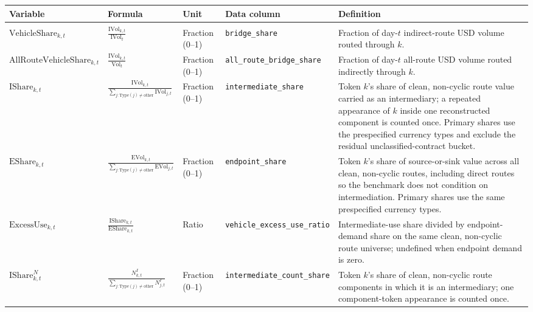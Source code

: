 \begin{tabularx}{\linewidth}{@{}>{\raggedright\arraybackslash}X>{\raggedright\arraybackslash}Xl>{\raggedright\arraybackslash}X>{\raggedright\arraybackslash}X@{}}
\toprule
Variable & Formula & Unit & Data column & Definition \\
\midrule
\addlinespace
\multicolumn{5}{@{}l}{\textit{Vehicle-use measures}} \\
$\mathrm{VehicleShare}_{k,t}$ & $\displaystyle\frac{\mathrm{IVol}_{k,t}}{\mathrm{IVol}_t}$ & Fraction (0--1) & \texttt{bridge\_\allowbreak{}share} & Fraction of day-$t$ indirect-route USD volume routed through $k$. \\
$\mathrm{AllRouteVehicleShare}_{k,t}$ & $\displaystyle\frac{\mathrm{IVol}_{k,t}}{\mathrm{Vol}_t}$ & Fraction (0--1) & \texttt{all\_\allowbreak{}route\_\allowbreak{}bridge\_\allowbreak{}share} & Fraction of day-$t$ all-route USD volume routed indirectly through $k$. \\
$\mathrm{IShare}_{k,t}$ & $\displaystyle\frac{\mathrm{IVol}_{k,t}}{\sum_{j:\mathrm{Type}(j)\ne\mathrm{other}}\mathrm{IVol}_{j,t}}$ & Fraction (0--1) & \texttt{intermediate\_\allowbreak{}share} & Token $k$'s share of clean, non-cyclic route value carried as an intermediary; a repeated appearance of $k$ inside one reconstructed component is counted once. Primary shares use the prespecified currency types and exclude the residual unclassified-contract bucket. \\
$\mathrm{EShare}_{k,t}$ & $\displaystyle\frac{\mathrm{EVol}_{k,t}}{\sum_{j:\mathrm{Type}(j)\ne\mathrm{other}}\mathrm{EVol}_{j,t}}$ & Fraction (0--1) & \texttt{endpoint\_\allowbreak{}share} & Token $k$'s share of source-or-sink value across all clean, non-cyclic routes, including direct routes so the benchmark does not condition on intermediation. Primary shares use the same prespecified currency types. \\
$\mathrm{ExcessUse}_{k,t}$ & $\displaystyle\frac{\mathrm{IShare}_{k,t}}{\mathrm{EShare}_{k,t}}$ & Ratio & \texttt{vehicle\_\allowbreak{}excess\_\allowbreak{}use\_\allowbreak{}ratio} & Intermediate-use share divided by endpoint-demand share on the same clean, non-cyclic route universe; undefined when endpoint demand is zero. \\
$\mathrm{IShare}^{N}_{k,t}$ & $\displaystyle\frac{N^{I}_{k,t}}{\sum_{j:\mathrm{Type}(j)\ne\mathrm{other}}N^{I}_{j,t}}$ & Fraction (0--1) & \texttt{intermediate\_\allowbreak{}count\_\allowbreak{}share} & Token $k$'s share of clean, non-cyclic route components in which it is an intermediary; one component-token appearance is counted once. \\

\end{tabularx}

